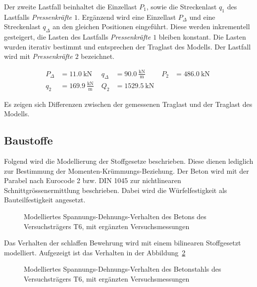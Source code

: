 \documentclass[
  11pt,
  letterpaper,
]{scrreprt}
\begin{document}
Der zweite Lastfall beinhaltet die Einzellast \(P_{1}\), sowie die
Streckenlast \(q_1\) des Lastfalls \emph{Pressenkräfte \(1\)}. Ergänzend
wird eine Einzellast \(P_{\Delta}\) und eine Streckenlast \(q_{\Delta}\)
an den gleichen Positionen eingeführt. Diese werden inkrementell
gesteigert, die Lasten des Lastfalls \emph{Pressenkräfte \(1\)} bleiben
konstant. Die Lasten wurden iterativ bestimmt und entsprechen der
Traglast des Modells. Der Lastfall wird mit \emph{Pressenkräfte \(2\)}
bezeichnet.

$$
\begin{aligned}
P_{\Delta} &= 11.0\ \mathrm{kN} \; 
 &q_{\Delta} &= 90.0\ \frac{\mathrm{kN}}{\mathrm{m}} \; 
 &P_{2} &= 486.0\ \mathrm{kN} \; 
\\[11pt]
 q_{2} &= 169.9\ \frac{\mathrm{kN}}{\mathrm{m}} \; 
 &Q_{2} &= 1529.5\ \mathrm{kN} \;
\end{aligned}
$$

Es zeigen sich Differenzen zwischen der gemessenen Traglast und der
Traglast des Modells.

\subsection{Baustoffe}\label{baustoffe}

Folgend wird die Modellierung der Stoffgesetze beschrieben. Diese dienen
lediglich zur Bestimmung der Momenten-Krümmungs-Beziehung. Der Beton
wird mit der Parabel nach Eurocode 2 bzw. DIN 1045 zur nichtlinearen
Schnittgrössenermittlung beschrieben. Dabei wird die Würfelfestigkeit
als Bauteilfestigkeit angesetzt.

\begin{figure}[H]


\caption{\label{fig-sigma_epc_t6}Modelliertes
Spannungs-Dehnungs-Verhalten des Betons des Versuchsträgers T6, mit
ergänzten Versuchsmessungen}

\end{figure}%

Das Verhalten der schlaffen Bewehrung wird mit einem bilinearen
Stoffgesetzt modelliert. Aufgezeigt ist das Verhalten in der
Abbildung~\ref{fig-sigma_eps_t6}

\begin{figure}[H]


\caption{\label{fig-sigma_eps_t6}Modelliertes
Spannungs-Dehnungs-Verhalten des Betonstahls des Versuchsträgers T6, mit
ergänzten Versuchsmessungen}

\end{figure}%
\end{document}
